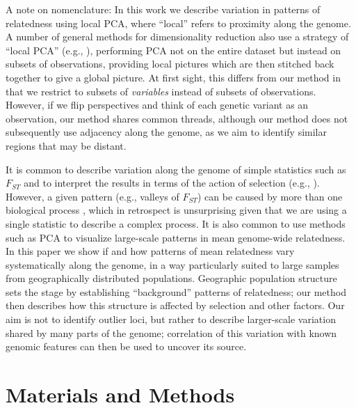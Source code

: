 \documentclass[11pt, oneside]{article}   	%
\newcommand\citet{\cite}
\newcommand\citep{\cite}
\renewcommand{\revpoint}[2]{\relax}
\begin{document}
A note on nomenclature: In this work we describe variation in patterns of relatedness using local PCA,
where ``local'' refers to proximity along the genome.
A number of general methods for dimensionality reduction also use a strategy of ``local PCA''
(e.g., \citet{manjon2013diffusion,kambhatla1997dimension,weingessel2000local,roweis2000nonlinear}),
performing PCA not on the entire dataset but instead on subsets of observations,
providing local pictures which are then stitched back together to give a global picture.
At first sight,
this differs from our method in that we restrict to subsets of \emph{variables} instead of subsets of observations.
However, if we flip perspectives and think of each genetic variant as an observation,
our method shares common threads, although 
our method does not subsequently use adjacency along the genome,
as we aim to identify similar regions that may be distant.

It is common to describe variation along the genome of simple statistics such as $F_{ST}$
and to interpret the results in terms of the action of selection 
(e.g., \citet{turner2005genomic,ellegren2012genomic}).
However, a given pattern (e.g., valleys of $F_{ST}$)
can be caused by more than one biological process \citep{cruickshank2014reanalysis,burri2015linked},
which in retrospect is unsurprising given that we are using a single statistic
to describe a complex process.
It is also common to use methods such as PCA to visualize large-scale patterns in 
mean genome-wide relatedness.
In this paper we show if and how patterns of mean relatedness vary systematically along the genome, 
in a way particularly suited to large samples from geographically distributed populations.
Geographic population structure sets the stage by establishing ``background'' patterns of relatedness;
our method then describes how this structure is affected by selection and other factors.
Our aim is not to identify outlier loci,
but rather to describe larger-scale variation shared by many parts of the genome;
correlation of this variation with known genomic features
can then be used to uncover its source. \revpoint{2}{1}



\section{Materials and Methods}
\end{document}
